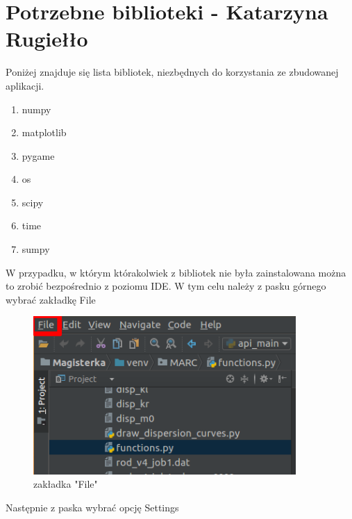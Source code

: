 \section{Potrzebne biblioteki - Katarzyna Rugiełło}

Poniżej znajduje się lista bibliotek, niezbędnych do korzystania ze zbudowanej aplikacji.

\begin{enumerate}
\item numpy
\item matplotlib
\item pygame
\item os
\item scipy
\item time
\item sumpy
\end{enumerate}

W przypadku, w którym którakolwiek z bibliotek nie była zainstalowana można to zrobić bezpośrednio z poziomu IDE. W tym celu należy z pasku górnego wybrać zakładkę File

\begin{figure}[h]
\centering
\includegraphics[width=10cm]{Zdjecia/5/kasia/file2}
\caption{zakładka "File"}
\label{fig:file}
\end{figure}

Następnie z paska wybrać opcję Settings

